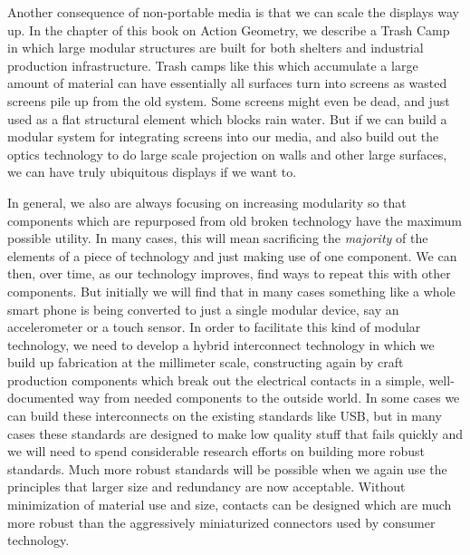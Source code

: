 Another consequence of non-portable media is that we can scale the displays way up.  In the chapter of this book on Action Geometry, we describe a Trash Camp in which large modular structures are built for both shelters and industrial production infrastructure.  Trash camps like this which accumulate a large amount of material can have essentially all surfaces turn into screens as wasted screens pile up from the old system.  Some screens might even be dead, and just used as a flat structural element which blocks rain water.  But if we can build a modular system for integrating screens into our media, and also build out the optics technology to do large scale projection on walls and other large surfaces, we can have truly ubiquitous displays if we want to.  

In general, we also are always focusing on increasing modularity so that components which are repurposed from old broken technology have the maximum possible utility.  In many cases, this will mean sacrificing the \emph{majority} of the elements of a piece of technology and just making use of one component.  We can then, over time, as our technology improves, find ways to repeat this with other components.  But initially we will find that in many cases something like a whole smart phone is being converted to just a single modular device, say an accelerometer or a touch sensor.  In order to facilitate this kind of modular technology, we need to develop a hybrid interconnect technology in which we build up fabrication at the millimeter scale, constructing again by craft production components which break out the electrical contacts in a simple, well-documented way from needed components to the outside world.  In some cases we can build these interconnects on the existing standards like USB, but in many cases these standards are designed to make low quality stuff that fails quickly and we will need to spend considerable research efforts on building more robust standards.  Much more robust standards will be possible when we again use the principles that larger size and redundancy are now acceptable.  Without minimization of material use and size, contacts can be designed which are much more robust than the aggressively miniaturized connectors used by consumer technology.

